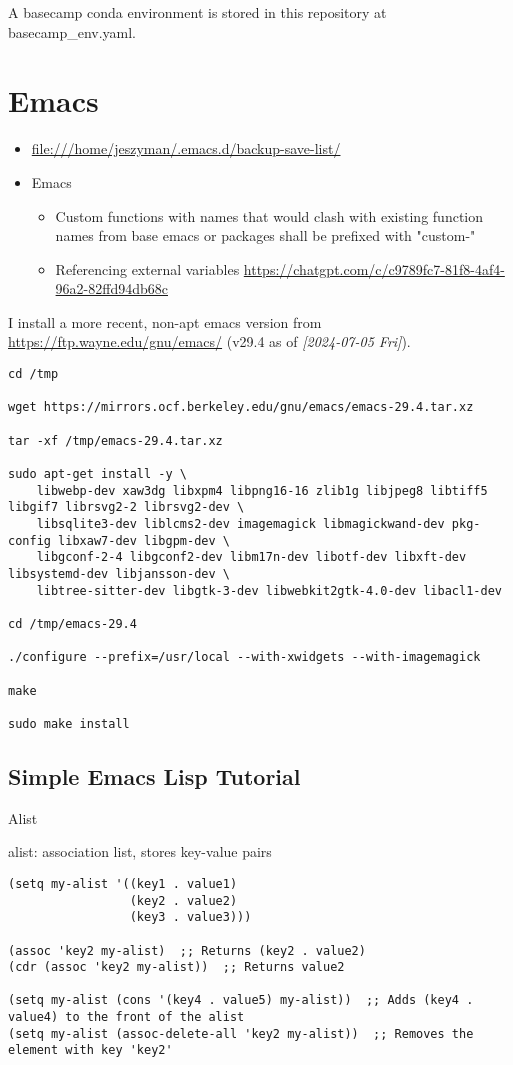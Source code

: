 \documentclass{article}
\begin{document}
A basecamp conda environment is stored in this repository at basecamp\_env.yaml.
\section*{Emacs}
\label{sec:orgdd9dc5e}
\begin{itemize}
\item \url{file:///home/jeszyman/.emacs.d/backup-save-list/}
\item Emacs
\begin{itemize}
\item Custom functions with names that would clash with existing function names from base emacs or packages shall be prefixed with "custom-"
\item Referencing external variables \url{https://chatgpt.com/c/c9789fc7-81f8-4af4-96a2-82ffd94db68c}
\end{itemize}
\end{itemize}
I install a more recent, non-apt emacs version from \url{https://ftp.wayne.edu/gnu/emacs/} (v29.4 as of \textit{[2024-07-05 Fri]}). 
\begin{verbatim}
cd /tmp

wget https://mirrors.ocf.berkeley.edu/gnu/emacs/emacs-29.4.tar.xz

tar -xf /tmp/emacs-29.4.tar.xz 

sudo apt-get install -y \
    libwebp-dev xaw3dg libxpm4 libpng16-16 zlib1g libjpeg8 libtiff5 libgif7 librsvg2-2 librsvg2-dev \
    libsqlite3-dev liblcms2-dev imagemagick libmagickwand-dev pkg-config libxaw7-dev libgpm-dev \
    libgconf-2-4 libgconf2-dev libm17n-dev libotf-dev libxft-dev libsystemd-dev libjansson-dev \
    libtree-sitter-dev libgtk-3-dev libwebkit2gtk-4.0-dev libacl1-dev

cd /tmp/emacs-29.4

./configure --prefix=/usr/local --with-xwidgets --with-imagemagick

make

sudo make install

\end{verbatim}
\subsection*{Simple Emacs Lisp Tutorial}
\label{sec:org8c83f56}
Alist



alist: association list, stores key-value pairs
\begin{verbatim}
(setq my-alist '((key1 . value1)
                 (key2 . value2)
                 (key3 . value3)))

(assoc 'key2 my-alist)  ;; Returns (key2 . value2)
(cdr (assoc 'key2 my-alist))  ;; Returns value2

(setq my-alist (cons '(key4 . value5) my-alist))  ;; Adds (key4 . value4) to the front of the alist
(setq my-alist (assoc-delete-all 'key2 my-alist))  ;; Removes the element with key 'key2'

\end{verbatim}
\end{document}
